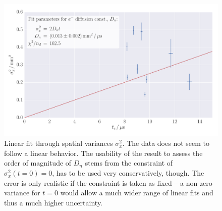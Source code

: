 \begin{figure}
    \includegraphics[width=1.0\textwidth]{figures/haynes_shockley_D_U}
    \caption{
        Linear fit through spatial variances $\sigma_x^2$. 
        The data does not seem to follow a linear behavior. 
        The usability of the result to assess the order of magnitude 
        of $D_n$ stems from the constraint of $\sigma_x^2(t = 0) = 0$, 
        has to be used very conservatively, though. The error 
        is only realistic if the constraint is taken as fixed -- 
        a non-zero variance for $t = 0$ would allow a much wider range of
        linear fits and thus a much higher uncertainty. 
        }
    \label{fig:h_s_D_U}
\end{figure}


